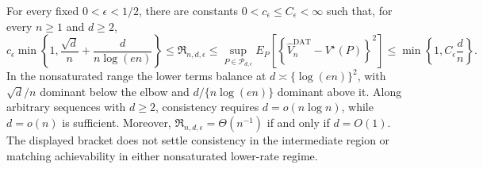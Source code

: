 For every fixed \(0<\epsilon<1/2\), there are constants \(0<c_\epsilon\leq C_\epsilon<\infty\) such that, for every \(n\geq1\) and \(d\geq2\),
\[
 c_\epsilon\min\!\left\{1,
   \frac{\sqrt d}{n}+\frac d{n\log(en)}
 \right\}
 \leq\mathfrak R_{n,d,\epsilon}
 \leq\sup_{P\in\mathcal P_{d,\epsilon}}
 E_P\!\left[
  \left\{\widehat V_n^{\mathrm{DAT}}-V^\star(P)\right\}^2
 \right]
 \leq\min\!\left\{1,C_\epsilon\frac dn\right\}.
\]
In the nonsaturated range the lower terms balance at \(d\asymp\{\log(en)\}^2\), with \(\sqrt d/n\) dominant below the elbow and \(d/\{n\log(en)\}\) dominant above it.  Along arbitrary sequences with \(d\geq2\), consistency requires \(d=o(n\log n)\), while \(d=o(n)\) is sufficient.  Moreover, \(\mathfrak R_{n,d,\epsilon}=\Theta(n^{-1})\) if and only if \(d=O(1)\).  The displayed bracket does not settle consistency in the intermediate region or matching achievability in either nonsaturated lower-rate regime.